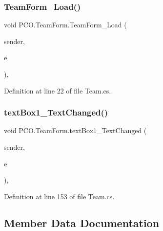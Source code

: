 \subsubsection{\texorpdfstring{Team\+Form\+\_\+\+Load()}{TeamForm\_Load()}}
{\footnotesize\ttfamily void P\+C\+O.\+Team\+Form.\+Team\+Form\+\_\+\+Load (\begin{DoxyParamCaption}\item[{object}]{sender,  }\item[{Event\+Args}]{e }\end{DoxyParamCaption})\hspace{0.3cm}{\ttfamily [inline]}, {\ttfamily [private]}}



Definition at line 22 of file Team.\+cs.

\mbox{\label{classPCO_1_1TeamForm_a2b1fa1f5a871fefa62572d40ca8a2ddb}} 
\subsubsection{\texorpdfstring{text\+Box1\+\_\+\+Text\+Changed()}{textBox1\_TextChanged()}}
{\footnotesize\ttfamily void P\+C\+O.\+Team\+Form.\+text\+Box1\+\_\+\+Text\+Changed (\begin{DoxyParamCaption}\item[{object}]{sender,  }\item[{Event\+Args}]{e }\end{DoxyParamCaption})\hspace{0.3cm}{\ttfamily [inline]}, {\ttfamily [private]}}



Definition at line 153 of file Team.\+cs.



\subsection{Member Data Documentation}
\mbox{\label{classPCO_1_1TeamForm_acabbe33eb1239f30a81e936b9db3f44b}} 
